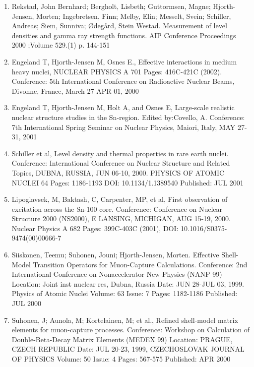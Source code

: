 \documentclass[a4wide,10pt]{article}
\begin{document}
\begin{enumerate}
\item Rekstad, John Bernhard; Bergholt, Lisbeth; Guttormsen, Magne; Hjorth-Jensen, Morten; Ingebretsen, Finn; Melby, Elin; Messelt, Svein; Schiller, Andreas; Siem, Sunniva; Ødegård, Stein Westad. Measurement of level densities and gamma ray strength functions. AIP Conference Proceedings 2000 ;Volume 529.(1) p. 144-151

\item Engeland T, Hjorth-Jensen M, Osnes E., Effective interactions in medium heavy nuclei, NUCLEAR PHYSICS A 701  Pages: 416C-421C (2002). Conference: 5th International Conference on Radioactive Nuclear Beams, Divonne, France, March 27-APR 01, 2000

\item Engeland T, Hjorth-Jensen M, Holt A, and Osnes E,   Large-scale realistic nuclear structure studies in the Sn-region. Edited by:Covello, A. Conference: 7th International Spring Seminar on Nuclear Physics, Maiori, Italy, MAY 27-31, 2001

\item Schiller et al,  Level density and thermal properties in rare earth nuclei. Conference: International Conference on Nuclear Structure and Related Topics, DUBNA, RUSSIA, JUN 06-10, 2000. PHYSICS OF ATOMIC NUCLEI 64  Pages: 1186-1193 DOI: 10.1134/1.1389540 Published: JUL 2001

\item Lipoglavsek, M, Baktash, C, Carpenter, MP,  et al, First observation of excitation across the Sn-100 core. Conference: Conference on Nuclear Structure 2000 (NS2000), E LANSING, MICHIGAN, AUG 15-19, 2000. Nuclear Physics A 682  Pages: 399C-403C (2001), DOI: 10.1016/S0375-9474(00)00666-7

\item Siiskonen, Teemu; Suhonen, Jouni; Hjorth-Jensen, Morten.  Effective Shell-Model Transition Operators for Muon-Capture Calculations.  Conference: 2nd International Conference on Nonaccelerator New Physics (NANP 99) Location: Joint inst nuclear res, Dubna, Russia Date: JUN 28-JUL 03, 1999. Physics of Atomic Nuclei  Volume: 63   Issue: 7   Pages: 1182-1186   Published: JUL 2000

\item Suhonen, J; Aunola, M; Kortelainen, M; et al., Refined shell-model matrix elements for muon-capture processes. Conference: Workshop on Calculation of Double-Beta-Decay Matrix Elements (MEDEX 99) Location: PRAGUE, CZECH REPUBLIC Date: JUL 20-23, 1999, CZECHOSLOVAK JOURNAL OF PHYSICS  Volume: 50   Issue: 4   Pages: 567-575   Published: APR 2000


\end{enumerate}
\end{document}
